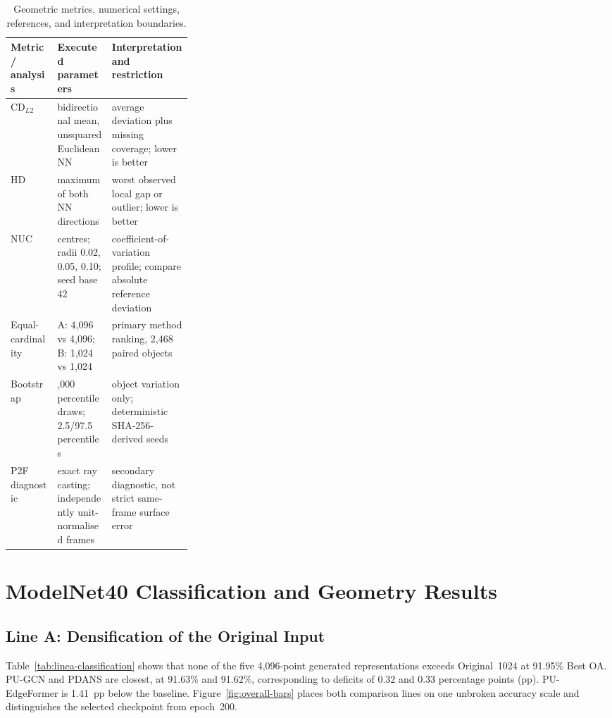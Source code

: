 \begin{table}[htbp]
\centering
\small
\begin{tabularx}{\linewidth}{l>{\raggedright\arraybackslash}p{0.30\linewidth}X}
\toprule
Metric / analysis & Executed parameters & Interpretation and restriction \\
\midrule
$\mathrm{CD}_{L2}$ & bidirectional mean, unsquared Euclidean NN & average deviation plus missing coverage; lower is better \\
HD & maximum of both NN directions & worst observed local gap or outlier; lower is better \\
NUC & 128 centres; radii 0.02, 0.05, 0.10; seed base 42 & coefficient-of-variation profile; compare absolute reference deviation \\
Equal-cardinality & A: 4,096 vs 4,096; B: 1,024 vs 1,024 & primary method ranking, 2,468 paired objects \\
Bootstrap & 4,000 percentile draws; 2.5/97.5 percentiles & object variation only; deterministic SHA-256-derived seeds \\
P2F diagnostic & exact ray casting; independently unit-normalised frames & secondary diagnostic, not strict same-frame surface error \\
\bottomrule
\end{tabularx}
\caption{Geometric metrics, numerical settings, references, and interpretation boundaries.}
\label{tab:geometry-parameters}
\end{table}

\section{ModelNet40 Classification and Geometry Results}
\label{sec:modelnet-results}

\subsection{Line A: Densification of the Original Input}
\label{sec:linea-results}

Table~\ref{tab:linea-classification} shows that none of the five 4,096-point generated representations exceeds Original~1024 at 91.95\% Best OA. PU-GCN and PDANS are closest, at 91.63\% and 91.62\%, corresponding to deficits of 0.32 and 0.33 percentage points (pp). PU-EdgeFormer is 1.41~pp below the baseline. Figure~\ref{fig:overall-bars} places both comparison lines on one unbroken accuracy scale and distinguishes the selected checkpoint from epoch~200.

